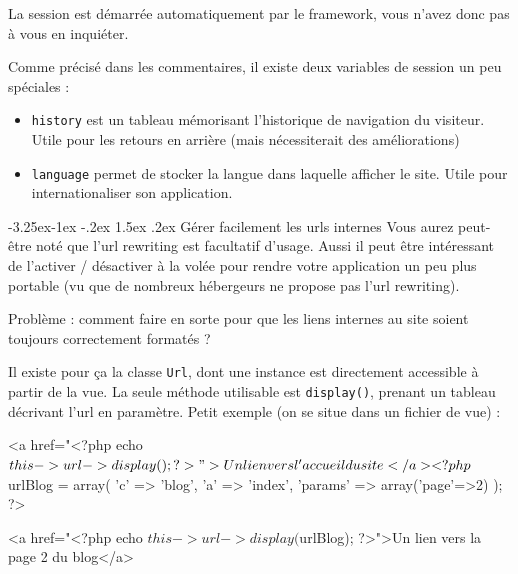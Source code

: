 \documentclass[a4paper,11pt]{article}
\makeatletter
\renewcommand{\subsection}{\@startsection{subsection}{2}{\z@}%
             {-3.25ex\@plus -1ex \@minus -.2ex}%
             {1.5ex \@plus .2ex}%
             {\color{bleuFonce}\normalfont\large\bfseries}}
\makeatother
\begin{document}
La session est démarrée automatiquement par le framework, vous n'avez donc pas à vous en inquiéter.

Comme précisé dans les commentaires, il existe deux variables de session un peu spéciales :
\begin{itemize}
  \item \texttt{history} est un tableau mémorisant l'historique de navigation du visiteur. Utile pour les retours en arrière (mais nécessiterait des améliorations)
  \item \texttt{language} permet de stocker la langue dans laquelle afficher le site. Utile pour internationaliser son application.
\end{itemize}

\subsection{Gérer facilement les urls internes}
Vous aurez peut-être noté que l'url rewriting est facultatif d'usage. Aussi il peut être intéressant de l'activer / désactiver à la volée pour rendre votre application un peu plus portable (vu que de nombreux hébergeurs ne propose pas l'url rewriting).

Problème : comment faire en sorte pour que les liens internes au site soient toujours correctement formatés ?

Il existe pour ça la classe \texttt{Url}, dont une instance est directement accessible à partir de la vue. La seule méthode utilisable est \texttt{display()}, prenant un tableau décrivant l'url en paramètre. Petit exemple (on se situe dans un fichier de vue) :
\begin{HTML}
<a href="<?php echo $this->url->display(); ?>">Un lien vers l'accueil du site</a>

<?php
  $urlBlog = array(
    'c' => 'blog',
    'a' => 'index',
    'params' => array('page'=>2)
  );
?>

<a href="<?php echo $this->url->display($urlBlog); ?>">Un lien vers la page 2 du blog</a>
\end{HTML}
\end{document}
